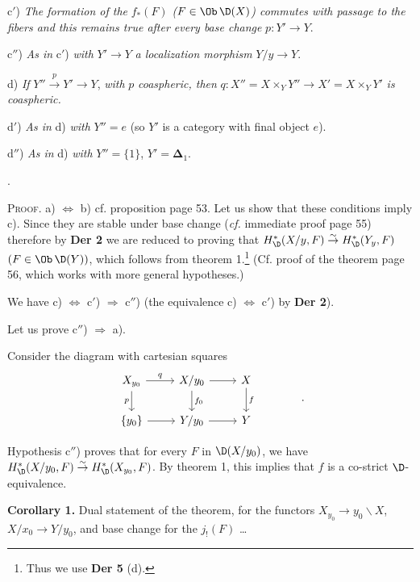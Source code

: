 c$'$) \textit{The formation of the} $f_*(F)$ \textit{(}$F \in \Ob\, \D(X)$\textit{) commutes with passage to the fibers and this remains true after every base change} $p : Y' \to Y$.

c$''$) \textit{As in} c$'$) \textit{with} $Y' \to Y$ \textit{a localization morphism} $Y/y \to Y$.

d) \textit{If} $Y'' \overset{p}{\to} Y' \to Y$, \textit{with} $p$ \textit{coaspheric, then} $q : X'' = X \times_Y Y'' \to X' = X \times_Y Y'$ \textit{is coaspheric.}


d$'$) \textit{As in} d) \textit{with} $Y'' = e$ (so $Y'$ is a category with final object $e$).

d$''$) \textit{As in} d) \textit{with} $Y'' = \{1\}$, $Y' = \boldsymbol{\Delta}_1$.

.

\noindent\textsc{Proof}. a) $\Leftrightarrow$ b) cf. proposition page 53. Let us show that these conditions imply c). Since they are stable under base change (\textit{cf.} immediate proof page 55) therefore by \textbf{Der 2} we are reduced to proving that $H^*_{\D}(X/y, F) \overset{\sim}{\to} H^*_{\D}(Y_y, F)$ $(F \in \Ob\, \D(Y))$, which follows from theorem 1.\footnote[30]{Thus we use \textbf{Der 5} (d).} (Cf. proof of the theorem page 56, which works with more general hypotheses.)

We have c) $\Leftrightarrow$ c$'$) $\Rightarrow$ c$''$) (the equivalence c) $\Leftrightarrow$ c$'$) by \textbf{Der 2}).

Let us prove c$''$) $\Rightarrow$ a).


\noindent Consider the diagram with cartesian squares
\[
\begin{tikzcd}
X_{y_0} \arrow[r, "q"] \arrow[d, "p"{swap}] & X/y_0 \arrow[r] \arrow[d, "f_0"] & X \arrow[d, "f"] \\
\{y_0\} \arrow[r] & Y/y_0 \arrow[r] & Y
\end{tikzcd}
\qquad\qquad .
\]

\noindent Hypothesis c$''$) proves that for every $F$ in $\D(X/y_0)$, we have $H^*_{\D}(X/y_0, F) \overset{\sim}{\to} H^*_{\D}(X_{y_0}, F)$. By theorem 1, this implies that $f$ is a co-strict $\D$-equivalence. %

\noindent\textbf{Corollary 1.} Dual statement of the theorem, for the functors $X_{y_0} \to y_0\backslash X$, $X/x_0 \to Y/y_0$, and base change for the $j_!(F)$ \ldots

